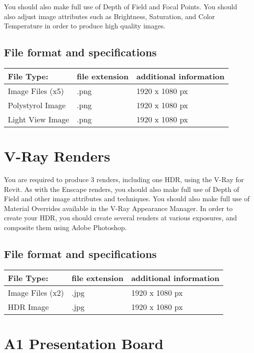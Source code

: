 You should also make full use of Depth of Field and Focal Points.  You should also adjust image attributes such as Brightness, Saturation, and Color Temperature in order to produce high quality images.

\subsection*{File format and specifications}

\begin{tabularx}{\textwidth}{ |X|X|X| }
	\hline
	\textbf{File Type:} & file extension & additional information\\
	\hline 
	Image Files (x5)  & .png & 1920 x 1080 px \\
	Polystyrol Image & .png & 1920 x 1080 px \\
	Light View Image  & .png & 1920 x 1080 px \\
	\hline
\end{tabularx}





\section*{V-Ray Renders}

You are required to produce 3 renders, including one HDR, using the V-Ray for Revit.  As with the Enscape renders, you should also make full use of Depth of Field and other image attributes and techniques.  You should also make full use of Material Overrides available in the V-Ray Appearance Manager.  In order to create your HDR, you should create several renders at various exposures, and composite them using Adobe Photoshop.

\subsection*{File format and specifications}

\begin{tabularx}{\textwidth}{ |X|X|X| }
	\hline
	\textbf{File Type:} & file extension & additional information\\
	\hline 
	Image Files (x2)  & .jpg & 1920 x 1080 px \\
	HDR Image & .jpg & 1920 x 1080 px \\
	\hline
\end{tabularx}



\section*{A1 Presentation Board}

